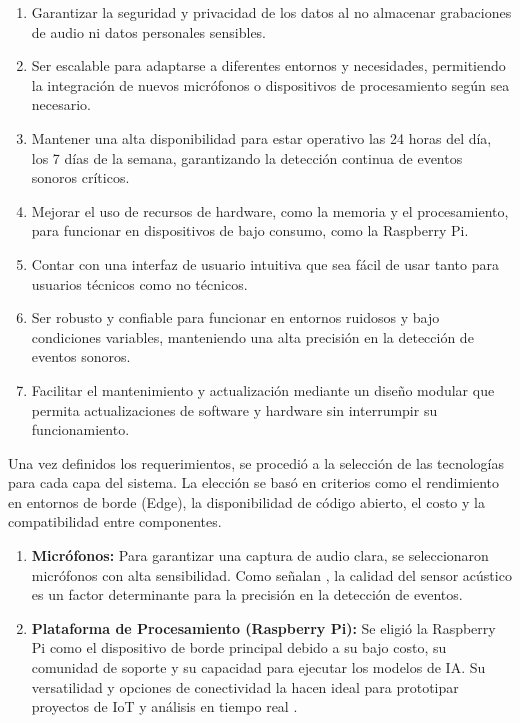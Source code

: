 
\begin{enumerate}
      \item Garantizar la seguridad y privacidad de los datos al no almacenar grabaciones de audio ni datos personales sensibles.
      \item Ser escalable para adaptarse a diferentes entornos y necesidades, permitiendo la integración de nuevos micrófonos o dispositivos de procesamiento según sea necesario.
      \item Mantener una alta disponibilidad para estar operativo las 24 horas del día, los 7 días de la semana, garantizando la detección continua de eventos sonoros críticos.
      \item Mejorar el uso de recursos de hardware, como la memoria y el procesamiento, para funcionar en dispositivos de bajo consumo, como la Raspberry Pi.
      \item Contar con una interfaz de usuario intuitiva que sea fácil de usar tanto para usuarios técnicos como no técnicos.
      \item Ser robusto y confiable para funcionar en entornos ruidosos y bajo condiciones variables, manteniendo una alta precisión en la detección de eventos sonoros.
      \item Facilitar el mantenimiento y actualización mediante un diseño modular que permita actualizaciones de software y hardware sin interrumpir su funcionamiento.
\end{enumerate}


Una vez definidos los requerimientos, se procedió a la selección de las tecnologías para cada capa del sistema. La elección se basó en criterios como el rendimiento en entornos de borde (Edge), la disponibilidad de código abierto, el costo y la compatibilidad entre componentes.


\begin{enumerate}
      \item \textbf{Micrófonos:} Para garantizar una captura de audio clara, se seleccionaron micrófonos con alta sensibilidad. Como señalan \citeauthor{torija_metodologia_2018} \citeyear{torija_metodologia_2018}, la calidad del sensor acústico es un factor determinante para la precisión en la detección de eventos.
      \item \textbf{Plataforma de Procesamiento (Raspberry Pi):} Se eligió la Raspberry Pi como el dispositivo de borde principal debido a su bajo costo, su comunidad de soporte y su capacidad para ejecutar los modelos de IA. Su versatilidad y opciones de conectividad la hacen ideal para prototipar proyectos de IoT y análisis en tiempo real \cite{richardson_getting_2016}.
\end{enumerate}

